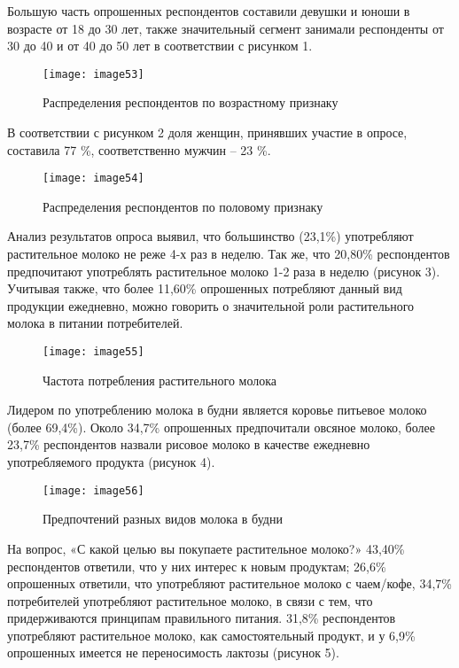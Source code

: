 \begin{multicols}{2}
Большую часть опрошенных респондентов составили девушки и юноши в
возрасте от 18 до 30 лет, также значительный сегмент занимали
респонденты от 30 до 40 и от 40 до 50 лет в соответствии с рисунком 1.
\end{multicols}

\begin{figure}[H]
\centering
\texttt{[image: image53]}
\caption{Распределения респондентов по возрастному признаку}
\end{figure}

В соответствии с рисунком 2 доля женщин, принявших участие в опросе,
составила 77 \%, соответственно мужчин -- 23 \%.

\begin{figure}[H]
\centering
\texttt{[image: image54]}
\caption{Распределения респондентов по половому признаку}
\end{figure}

Анализ результатов опроса выявил, что большинство (23,1\%) употребляют
растительное молоко не реже 4-х раз в неделю. Так же, что 20,80\%
респондентов предпочитают употреблять растительное молоко 1-2 раза в
неделю (рисунок 3). Учитывая также, что более 11,60\% опрошенных
потребляют данный вид продукции ежедневно, можно говорить о значительной
роли растительного молока в питании потребителей.

\begin{figure}[H]
\centering
\texttt{[image: image55]}
\caption{Частота потребления растительного молока}
\end{figure}

Лидером по употреблению молока в будни является коровье питьевое молоко
(более 69,4\%). Около 34,7\% опрошенных предпочитали овсяное молоко,
более 23,7\% респондентов назвали рисовое молоко в качестве ежедневно
употребляемого продукта (рисунок 4).

\begin{figure}[H]
\centering
\texttt{[image: image56]}
\caption{Предпочтений разных видов молока в будни}
\end{figure}

На вопрос, «С какой целью вы покупаете растительное молоко?» 43,40\%
респондентов ответили, что у них интерес к новым продуктам; 26,6\%
опрошенных ответили, что употребляют растительное молоко с чаем/кофе,
34,7\% потребителей употребляют растительное молоко, в связи с тем, что
придерживаются принципам правильного питания. 31,8\% респондентов
употребляют растительное молоко, как самостоятельный продукт, и у 6,9\%
опрошенных имеется не переносимость лактозы (рисунок 5).

